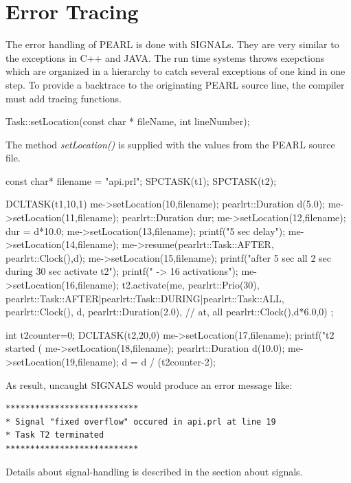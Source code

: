\section{Error Tracing}
The error handling of PEARL is done with SIGNALs.
They are very similar to the exceptions in C++ and JAVA. 
The run time systems throws exepctions which are organized in a
hierarchy to catch several exceptions of one kind in one step.
To provide a backtrace to the originating PEARL source line, the compiler 
must add tracing functions.
\begin{CppCode}
Task::setLocation(const char * fileName, int lineNumber);
\end{CppCode}
The method {\em setLocation()} is supplied with the values from
the PEARL source file.

\begin{CppCode}
const char* filename =  "api.prl";
SPCTASK(t1);
SPCTASK(t2);

DCLTASK(t1,10,1) {
   me->setLocation(10,filename);
   pearlrt::Duration d(5.0);
   me->setLocation(11,filename);
   pearlrt::Duration dur;
   me->setLocation(12,filename);
   dur = d*10.0;
   me->setLocation(13,filename);
   printf("5 sec delay\n");
   me->setLocation(14,filename);
   me->resume(pearlrt::Task::AFTER, pearlrt::Clock(),d);
   me->setLocation(15,filename);    
   printf("after 5 sec all 2 sec during 30 sec activate  t2\n");
   printf("    -> 16 activations\n");
   me->setLocation(16,filename);
   t2.activate(me, pearlrt::Prio(30),
               pearlrt::Task::AFTER|pearlrt::Task::DURING|pearlrt::Task::ALL,
               pearlrt::Clock(), d, pearlrt::Duration(2.0), // at, all
               pearlrt::Clock(),d*6.0,0) ;    
}

int t2counter=0;
DCLTASK(t2,20,0) {
   me->setLocation(17,filename);
   printf("t2 started (%
   me->setLocation(18,filename);
   pearlrt::Duration d(10.0);
   me->setLocation(19,filename);
   d = d / (t2counter-2);
}
\end{CppCode}

As result, uncaught SIGNALS would produce an error message like:
\begin{verbatim}
***************************
* Signal "fixed overflow" occured in api.prl at line 19
* Task T2 terminated
***************************
\end{verbatim}

Details about signal-handling is described in the section about signals.

